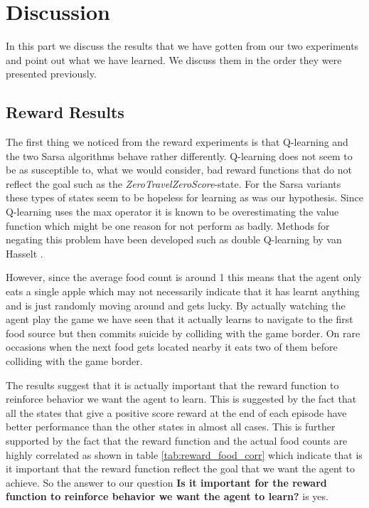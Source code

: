 \documentclass[result.tex]{subfiles}
\begin{document}
    \section*{\centering Discussion}

    In this part we discuss the results that we have gotten from our two experiments and point out what we have learned. We discuss them in the order they were presented previously.

    \subsection*{Reward Results}

    The first thing we noticed from the reward experiments is that Q-learning and the two Sarsa algorithms behave rather differently. Q-learning does not seem to be as susceptible to, what we would consider, bad reward functions that do not reflect the goal such as the \textit{ZeroTravelZeroScore}-state. For the Sarsa variants these types of states seem to be hopeless for learning as was our hypothesis. Since Q-learning uses the max operator it is known to be overestimating the value function which might be one reason for not perform as badly. Methods for negating this problem have been developed such as double Q-learning by van Hasselt \cite{hasselt2010double}.

    However, since the average food count is around 1 this means that the agent only eats a single apple which may not necessarily indicate that it has learnt anything and is just randomly moving around and gets lucky. By actually watching the agent play the game we have seen that it actually learns to navigate to the first food source but then commits suicide by colliding with the game border. On rare occasions when the next food gets located nearby it eats two of them before colliding with the game border.

    The results suggest that it is actually important that the reward function to reinforce behavior we want the agent to learn. This is suggested by the fact that all the states that give a positive score reward at the end of each episode have better performance than the other states in almost all cases. This is further supported by the fact that the reward function and the actual food counts are highly correlated as shown in table \ref{tab:reward_food_corr} which indicate that is it important that the reward function reflect the goal that we want the agent to achieve. So the answer to our question \textbf{Is it important for the reward function to reinforce behavior we
    want the agent to learn?} is yes.
\end{document}
